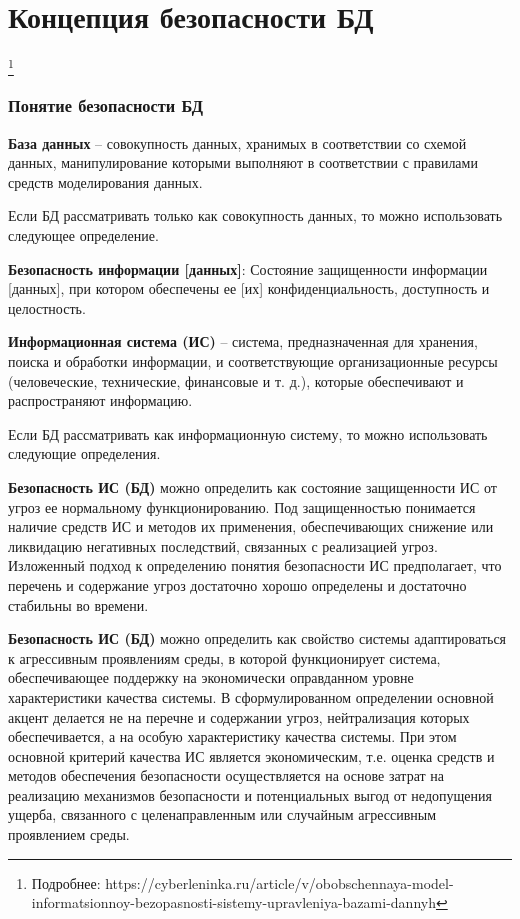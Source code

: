 \section{Концепция безопасности БД}\footnote{Подробнее: https://cyberleninka.ru/article/v/obobschennaya-model-informatsionnoy-bezopasnosti-sistemy-upravleniya-bazami-dannyh}
\subsubsection{Понятие безопасности БД}
\textbf{База данных} -- совокупность данных, хранимых в соответствии со схемой данных, манипулирование которыми выполняют в соответствии с правилами средств моделирования данных.

Если БД рассматривать только как совокупность данных, то можно использовать следующее определение.

\textbf{Безопасность информации [данных]}: Состояние защищенности информации [данных], при котором обеспечены ее [их] конфиденциальность, доступность и целостность.

\textbf{Информационная система (ИС)} -- система, предназначенная для хранения, поиска и обработки информации, и соответствующие организационные ресурсы (человеческие, технические, финансовые и т. д.), которые обеспечивают и распространяют информацию.

Если БД рассматривать как информационную систему, то можно использовать следующие определения.

\textbf{Безопасность ИС (БД)} можно определить как состояние защищенности ИС от угроз ее нормальному функционированию. Под защищенностью понимается наличие средств ИС и методов их применения, обеспечивающих снижение или ликвидацию негативных последствий, связанных с реализацией угроз. Изложенный подход к определению понятия безопасности ИС предполагает, что перечень и содержание угроз достаточно хорошо определены и достаточно стабильны во времени.

\textbf{Безопасность ИС (БД)} можно определить как свойство системы адаптироваться к агрессивным проявлениям среды, в которой функционирует система, обеспечивающее поддержку на экономически оправданном уровне характеристики качества системы. В сформулированном определении основной акцент делается не на перечне и содержании угроз, нейтрализация которых обеспечивается, а на особую характеристику качества системы. При этом основной критерий качества ИС является экономическим, т.е. оценка средств и методов обеспечения безопасности осуществляется на основе затрат на реализацию механизмов безопасности и потенциальных выгод от недопущения ущерба, связанного с целенаправленным или случайным агрессивным проявлением среды.

